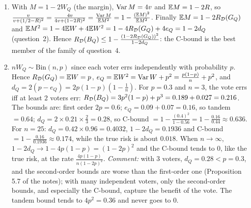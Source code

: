 \documentclass[11pt]{article}
\begin{document}
\begin{solution}
\begin{enumerate}
      which vanishes at $\mu^\star=\frac{R/2-e}{1/2-R}$ (when $R<\frac12$), is negative before and positive after: $\mu^\star$ is
      the minimum. To compute $f(\mu^\star)$, note that $\mu^\star-R=\frac{R/2-e-R/2+R^2}{1/2-R}=\frac{-v}{1/2-R}$ and
      $\frac12-\mu^\star=\frac{1/4-R/2-R/2+e}{1/2-R}=\frac{v+(1/2-R)^2}{1/2-R}$. The numerator is
      $e-2\mu^\star R+\mu^{\star2}=(\mu^\star-R)^2+v=\frac{v^2}{(1/2-R)^2}+v=\frac{v\,(v+(1/2-R)^2)}{(1/2-R)^2}$, so
      \[f(\mu^\star)=\frac{v\,(v+(1/2-R)^2)}{(1/2-R)^2}\cdot\frac{(1/2-R)^2}{(v+(1/2-R)^2)^2}=\frac{v}{v+(1/2-R)^2},\]
      which is Cantelli's inequality for $W_Q$ with $a=\frac12-R$.
\item With $M=1-2W_Q$ (the margin), $\operatorname{Var} M=4v$ and $\mathbb{E} M=1-2R$, so $\frac{v}{v+(1/2-R)^2}=\frac{4v}{4v+(1-2R)^2}=\frac{\operatorname{Var} M}{\mathbb{E} M^2}=1-\frac{(\mathbb{E} M)^2}{\mathbb{E} M^2}$.
      Finally $\mathbb{E} M=1-2R_{\mathcal{D}}(G_{Q})$ and $\mathbb{E} M^2=1-4\mathbb{E} W+4\mathbb{E} W^2=1-4R_{\mathcal{D}}(G_{Q})+4e_Q=1-2d_Q$ (question~2). Hence
      $R_{\mathcal{D}}(B_{Q})\leq1-\frac{(1-2R_{\mathcal{D}}(G_{Q}))^2}{1-2d_Q}$: the C-bound is the best member of the family of question~4.
\item $nW_Q\sim\mathrm{Bin}(n,p)$ since each voter errs independently with probability $p$. Hence $R_{\mathcal{D}}(G_{Q})=\mathbb{E} W=p$,
      $e_Q=\mathbb{E} W^2=\operatorname{Var} W+p^2=\frac{p(1-p)}n+p^2$, and $d_Q=2(p-e_Q)=2p(1-p)(1-\frac1n)$.
      For $p=0.3$ and $n=3$, the vote errs iff at least $2$ voters err: $R_{\mathcal{D}}(B_{Q})=3p^2(1-p)+p^3=0.189+0.027=0.216$. The
      bounds are: first order $2p=0.6$; $e_Q=0.09+0.07=0.16$, so tandem $=0.64$; $d_Q=2\times0.21\times\frac23=0.28$, so
      C-bound $=1-\frac{(0.4)^2}{1-0.56}=1-\frac{0.16}{0.44}\approx0.636$. For $n=25$: $d_Q=0.42\times0.96=0.4032$,
      $1-2d_Q=0.1936$ and C-bound $=1-\frac{0.16}{0.1936}\approx0.174$, while the true risk is about $0.018$. When $n\to\infty$,
      $1-2d_Q\to1-4p(1-p)=(1-2p)^2$ and the C-bound tends to $0$, like the true risk, at the rate $\frac{4p(1-p)}{n(1-2p)^2}$.
      \emph{Comment:} with $3$ voters, $d_Q=0.28<p=0.3$, and the second-order bounds are worse than the first-order
      one (Proposition 5.7 of the notes); with many independent voters, only the second-order bounds, and
      especially the C-bound, capture the benefit of the vote. The tandem bound tends to $4p^2=0.36$ and never goes
      to $0$.
\end{enumerate}
\end{solution}
\end{document}
